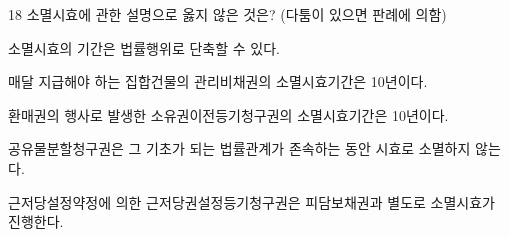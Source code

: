 \begin{question}{18}
소멸시효에 관한 설명으로 옳지 않은 것은? (다툼이 있으면 판례에 의함)
\begin{choices}
  \item 소멸시효의 기간은 법률행위로 단축할 수 있다.
  \item 매달 지급해야 하는 집합건물의 관리비채권의 소멸시효기간은 10년이다.
  \item 환매권의 행사로 발생한 소유권이전등기청구권의 소멸시효기간은 10년이다.
  \item 공유물분할청구권은 그 기초가 되는 법률관계가 존속하는 동안 시효로 소멸하지 않는다.
  \item 근저당설정약정에 의한 근저당권설정등기청구권은 피담보채권과 별도로 소멸시효가 진행한다.
\end{choices}
\end{question}
